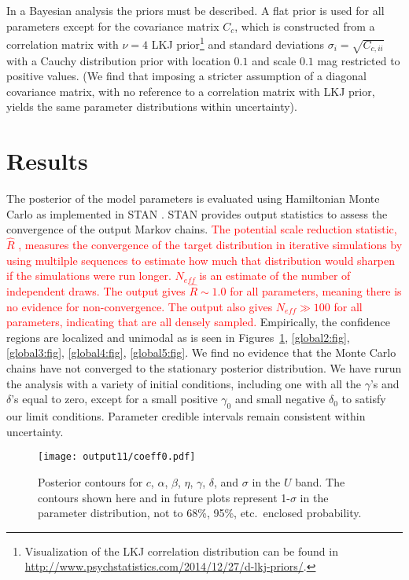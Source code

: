 \documentclass{aastex61}   	%
\begin{document}
In a Bayesian analysis the priors must be described.  A flat prior is used for all parameters except
for the covariance matrix $C_c$, which is constructed from a correlation matrix with  $\nu=4$  LKJ prior\footnote{
Visualization of the LKJ correlation distribution can be found in \url{http://www.psychstatistics.com/2014/12/27/d-lkj-priors/}.}
\citep{Lewandowski20091989} and standard
deviations $\sigma_i = \sqrt{C_{c,ii}}$ with a  Cauchy distribution prior with location
 $0.1$ and scale $0.1$ mag restricted to positive values.  (We find that imposing a stricter assumption of a
 diagonal covariance matrix, with no reference to a correlation matrix with LKJ prior, yields the same parameter distributions within
 uncertainty).

\section{Results}
\label{results:sec}
The posterior of the model parameters is evaluated using Hamiltonian Monte Carlo as implemented in
STAN \citep{stan}. STAN provides output statistics to assess
the convergence of the output Markov chains.
\textcolor{red}{The 
potential scale reduction statistic, $\hat{R}$ \citep{Gelman92}, measures the convergence of the target distribution
in iterative simulations 
by using multilple sequences to estimate how much that distribution would sharpen if the simulations were run longer.
$N_{eff}$ is an estimate of the number of independent draws.
The output gives $\hat{R} \sim 1.0$ for all parameters, meaning there is no evidence for non-convergence.  The
output also gives  $N_{eff} \gg 100$ for all parameters, indicating that are all densely sampled.}
Empirically, the confidence regions are localized and unimodal as is seen in  Figures~\ref{global1:fig}, \ref{global2:fig}, \ref{global3:fig}, \ref{global4:fig},
\ref{global5:fig}.  We find no evidence that
the Monte Carlo chains have not converged to the stationary posterior distribution.
We have rurun the analysis with a variety of initial conditions, including one with all the $\gamma$'s and $\delta$'s equal to zero, except for a small positive 
$\gamma_0$ and small negative $\delta_0$ to satisfy our limit conditions.  Parameter credible intervals
remain consistent within uncertainty.

\begin{figure}[htbp] %
   \centering
   \texttt{[image: output11/coeff0.pdf]} 
            \caption{Posterior contours for $c$, $\alpha$, $\beta$, $\eta$, $\gamma$, $\delta$, and $\sigma$ in the $U$ band.
            The contours shown here and in future plots represent 1-$\sigma$ in the parameter distribution, not to 68\%, 95\%, etc.\
            enclosed probability.  \label{global1:fig}}
\end{figure}
\end{document}
